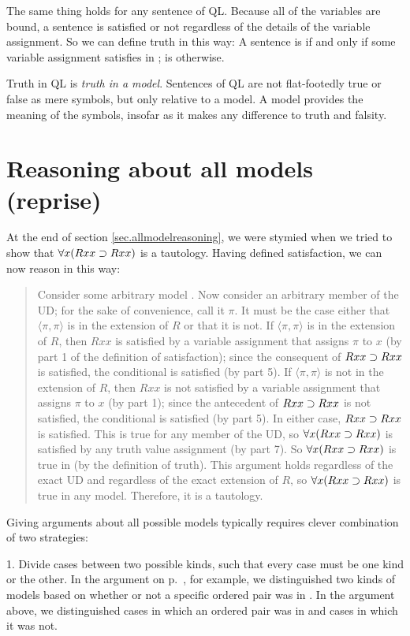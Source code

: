The same thing holds for any sentence of QL. Because all of the variables are bound, a sentence is satisfied or not regardless of the details of the variable assignment. So we can define truth in this way: A sentence \metaA{} is   if and only if some variable assignment satisfies \metaA{} in ; \metaA{} is   otherwise.

Truth in QL is \emph{truth in a model}. Sentences of QL are not flat-footedly true or false as mere symbols, but only relative to a model. A model provides the meaning of the symbols, insofar as it makes any difference to truth and falsity.


\section{Reasoning about all models (reprise)}
At the end of section \ref{sec.allmodelreasoning}, we were stymied when we tried to show that $\forall x(Rxx\supset Rxx)$ is a tautology. Having defined satisfaction, we can now reason in this way:
\begin{quote}
Consider some arbitrary model . Now consider an arbitrary member of the UD; for the sake of convenience, call it $\pi$. It must be the case either that $\langle\pi,\pi\rangle$ is in the extension of $R$ or that it is not. If $\langle\pi,\pi\rangle$ is in the extension of $R$, then $Rxx$ is satisfied by a variable assignment that assigns $\pi$ to $x$ (by part 1 of the definition of  {satisfaction}); since the consequent of $Rxx\supset Rxx$ is satisfied, the conditional is satisfied (by part 5). If $\langle\pi,\pi\rangle$ is not in the extension of $R$, then $Rxx$ is not satisfied by a variable assignment that assigns $\pi$ to $x$ (by part 1); since the antecedent of $Rxx\supset Rxx$ is not satisfied, the conditional is satisfied (by part 5). In either case, $Rxx\supset Rxx$ is satisfied. This is true for any member of the UD, so $\forall x(Rxx \supset Rxx)$ is satisfied by any truth value assignment (by part 7). So $\forall x(Rxx \supset Rxx)$ is true in  (by the definition of {truth}). This argument holds regardless of the exact UD and regardless of the exact extension of $R$, so $\forall x(Rxx \supset Rxx)$ is true in any model. Therefore, it is a tautology.
\end{quote}

Giving arguments about all possible models typically requires clever combination of two strategies:

1. Divide cases between two possible kinds, such that every case must be one kind or the other.  In the argument on p.~\pageref{allmodels1}, for example, we distinguished two kinds of models based on whether or not a specific ordered pair was in . In the argument above, we distinguished cases in which an ordered pair was in  and cases in which it was not.

